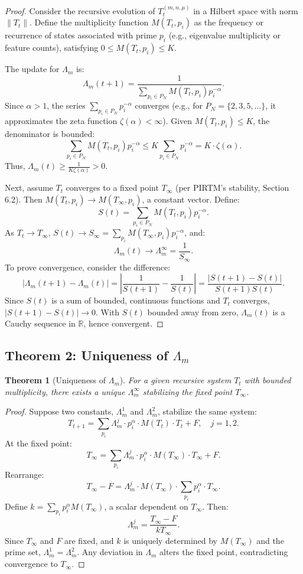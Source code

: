 \documentclass{article}
\theoremstyle{plain}
\newtheorem{theorem}{Theorem}
\begin{document}
\begin{proof}
Consider the recursive evolution of \( T_t^{(m, n, \mu)} \) in a Hilbert space with norm \( \| T_t \| \). Define the multiplicity function \( M(T_t, p_i) \) as the frequency or recurrence of states associated with prime \( p_i \) (e.g., eigenvalue multiplicity or feature counts), satisfying \( 0 \leq M(T_t, p_i) \leq K \).

The update for \(\Lambda_m\) is:
\[
\Lambda_m(t+1) = \frac{1}{\sum_{p_i \in P_N} M(T_t, p_i) p_i^{-\alpha}}.
\]
Since \(\alpha > 1\), the series \(\sum_{p_i \in P_N} p_i^{-\alpha}\) converges (e.g., for \( P_N = \{2, 3, 5, \ldots\} \), it approximates the zeta function \(\zeta(\alpha) < \infty\)). Given \( M(T_t, p_i) \leq K \), the denominator is bounded:
\[
\sum_{p_i \in P_N} M(T_t, p_i) p_i^{-\alpha} \leq K \sum_{p_i \in P_N} p_i^{-\alpha} = K \cdot \zeta(\alpha).
\]
Thus, \(\Lambda_m(t) \geq \frac{1}{K \zeta(\alpha)} > 0\).

Next, assume \( T_t \) converges to a fixed point \( T_\infty \) (per PIRTM’s stability, Section 6.2). Then \( M(T_t, p_i) \to M(T_\infty, p_i) \), a constant vector. Define:
\[
S(t) = \sum_{p_i \in P_N} M(T_t, p_i) p_i^{-\alpha}.
\]
As \( T_t \to T_\infty \), \( S(t) \to S_\infty = \sum_{p_i} M(T_\infty, p_i) p_i^{-\alpha} \), and:
\[
\Lambda_m(t) \to \Lambda_m^\infty = \frac{1}{S_\infty}.
\]
To prove convergence, consider the difference:
\[
|\Lambda_m(t+1) - \Lambda_m(t)| = \left| \frac{1}{S(t+1)} - \frac{1}{S(t)} \right| = \frac{|S(t+1) - S(t)|}{S(t+1) S(t)}.
\]
Since \( S(t) \) is a sum of bounded, continuous functions and \( T_t \) converges, \( |S(t+1) - S(t)| \to 0 \). With \( S(t) \) bounded away from zero, \(\Lambda_m(t)\) is a Cauchy sequence in \(\mathbb{R}\), hence convergent.
\end{proof}

\subsection{Theorem 2: Uniqueness of \(\Lambda_m\)}
\begin{theorem}[Uniqueness of \(\Lambda_m\)]
For a given recursive system \( T_t \) with bounded multiplicity, there exists a unique \(\Lambda_m^\infty\) stabilizing the fixed point \( T_\infty \).
\end{theorem}

\begin{proof}
Suppose two constants, \(\Lambda_m^1\) and \(\Lambda_m^2\), stabilize the same system:
\[
T_{t+1} = \sum_{p_i} \Lambda_m^j \cdot p_i^\alpha \cdot M(T_t) \cdot T_t + F, \quad j = 1, 2.
\]
At the fixed point:
\[
T_\infty = \sum_{p_i} \Lambda_m^j \cdot p_i^\alpha \cdot M(T_\infty) \cdot T_\infty + F.
\]
Rearrange:
\[
T_\infty - F = \Lambda_m^j \cdot M(T_\infty) \cdot \sum_{p_i} p_i^\alpha \cdot T_\infty.
\]
Define \( k = \sum_{p_i} p_i^\alpha M(T_\infty) \), a scalar dependent on \( T_\infty \). Then:
\[
\Lambda_m^j = \frac{T_\infty - F}{k T_\infty}.
\]
Since \( T_\infty \) and \( F \) are fixed, and \( k \) is uniquely determined by \( M(T_\infty) \) and the prime set, \(\Lambda_m^1 = \Lambda_m^2\). Any deviation in \(\Lambda_m\) alters the fixed point, contradicting convergence to \( T_\infty \).
\end{proof}
\end{document}
